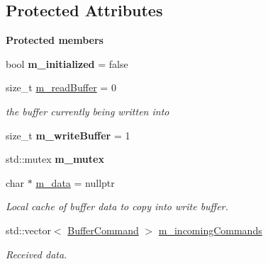 \subsection*{Protected Attributes}
\begin{Indent}\textbf{ Protected members}\par
\begin{DoxyCompactItemize}
\item 
\mbox{\label{classrev_1_1_buffer_queue_a365a371f1f2d799e61bd8b961d27a50b}} 
bool {\bfseries m\+\_\+initialized} = false
\item 
\mbox{\label{classrev_1_1_buffer_queue_a0fa634d78b8bba1bb67fc6f0b5dd19b4}} 
size\+\_\+t \mbox{\hyperlink{classrev_1_1_buffer_queue_a0fa634d78b8bba1bb67fc6f0b5dd19b4}{m\+\_\+read\+Buffer}} = 0
\begin{DoxyCompactList}\small\item\em the buffer currently being written into \end{DoxyCompactList}\item 
\mbox{\label{classrev_1_1_buffer_queue_a17684ce8858b7e4fdc3f04a47c9ec097}} 
size\+\_\+t {\bfseries m\+\_\+write\+Buffer} = 1
\item 
\mbox{\label{classrev_1_1_buffer_queue_aa32afdb6929831074792523d870f8617}} 
std\+::mutex {\bfseries m\+\_\+mutex}
\item 
\mbox{\label{classrev_1_1_buffer_queue_a0abc19266f74cdf17b7fe870abfc852a}} 
char $\ast$ \mbox{\hyperlink{classrev_1_1_buffer_queue_a0abc19266f74cdf17b7fe870abfc852a}{m\+\_\+data}} = nullptr
\begin{DoxyCompactList}\small\item\em Local cache of buffer data to copy into write buffer. \end{DoxyCompactList}\item 
\mbox{\label{classrev_1_1_buffer_queue_ab87ae9d35c791eeee06e572a6c6d856b}} 
std\+::vector$<$ \mbox{\hyperlink{structrev_1_1_buffer_command}{Buffer\+Command}} $>$ \mbox{\hyperlink{classrev_1_1_buffer_queue_ab87ae9d35c791eeee06e572a6c6d856b}{m\+\_\+incoming\+Commands}}
\begin{DoxyCompactList}\small\item\em Received data. \end{DoxyCompactList}\item 

\end{DoxyCompactItemize}
\end{Indent}
